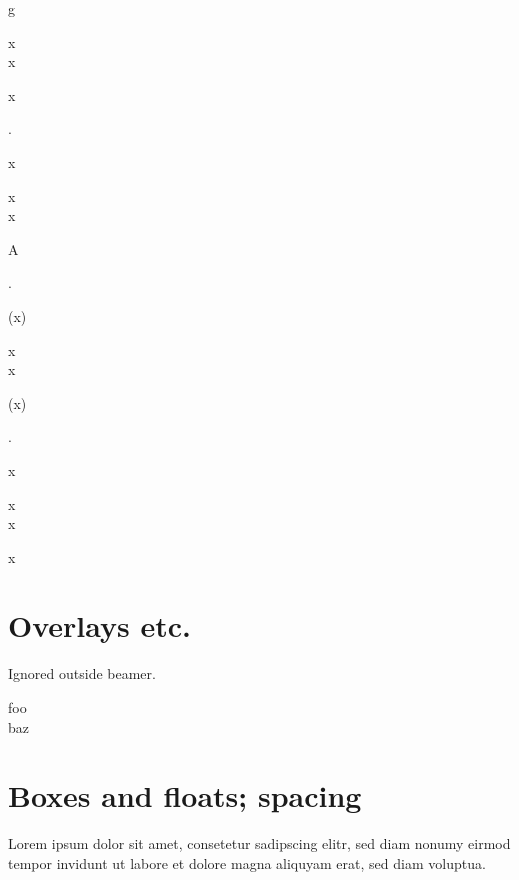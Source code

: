 \documentclass{article}
\begin{document}
{\begin{minipage}[t]{2em}
g

\begin{pseudo*}[hl]
x \\
x
\end{pseudo*}%

x
\end{minipage}%
%
%
%
\begin{minipage}[t]{2em}
.

x

\begin{pseudo*}[hl]
x \\
x
\end{pseudo*}%

A
\end{minipage}%
%
%
%
\begin{minipage}[t]{2em}
.

(x)

\begin{pseudo*}[hl]
x \\
x
\end{pseudo*}%

(x)
\end{minipage}%
%
%
%
\begin{minipage}[t]{2em}
.

\strut x

\begin{pseudo*}[hl]
x \\
x
\end{pseudo*}%

\strut x
\end{minipage}%
}

\section*{Overlays etc.}

Ignored outside \textsf{beamer}.

\begin{pseudo}[pause, kwfont<3>=\nf, unknown<3>=42]
    foo \\<2>
    baz
\end{pseudo}

\clearpage

\section*{Boxes and floats; spacing}

Lorem ipsum dolor sit amet, consetetur sadipscing elitr, sed diam nonumy eirmod
tempor invidunt ut labore et dolore magna aliquyam erat, sed diam voluptua.
\end{document}
